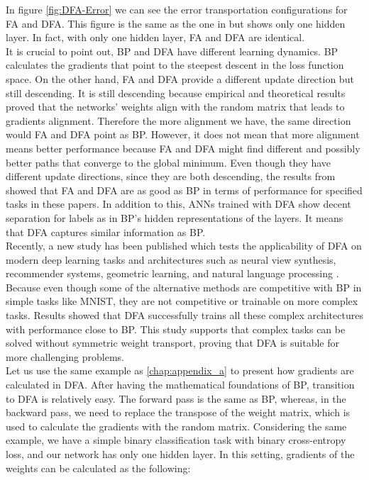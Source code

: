 \documentclass[a4paper, nobind]{templates/ociamthesis}
\begin{document}
\noindent In figure \ref{fig:DFA-Error} we can see the error transportation configurations for FA and DFA. This figure is the same as the one in \cite{nøkland2016direct} but shows only one hidden layer. In fact, with only one hidden layer, FA and DFA are identical.\\
It is crucial to point out, BP and DFA have different learning dynamics. BP calculates the gradients that point to the steepest descent in the loss function space. On the other hand, FA and DFA provide a different update direction but still descending. It is still descending because empirical and theoretical results proved that the networks' weights align with the random matrix that leads to gradients alignment. Therefore the more alignment we have, the same direction would FA and DFA point as BP. However, it does not mean that more alignment means better performance because FA and DFA might find different and possibly better paths that converge to the global minimum. Even though they have different update directions, since they are both descending, the results from \cite{lillicrap2014random, nøkland2016direct} showed that FA and DFA are as good as BP in terms of performance for specified tasks in these papers. In addition to this, ANNs trained with DFA show decent separation for labels as in BP's hidden representations of the layers. It means that DFA captures similar information as BP.\\
Recently, a new study has been published which tests the applicability of DFA on modern deep learning tasks and architectures such as neural view synthesis, recommender systems, geometric learning, and natural language processing \cite{launay2020direct}. Because even though some of the alternative methods are competitive with BP in simple tasks like MNIST, they are not competitive or trainable on more complex tasks. Results showed that DFA successfully trains all these complex architectures with performance close to BP. This study supports that complex tasks can be solved without symmetric weight transport, proving that DFA is suitable for more challenging problems.\\
Let us use the same example as \ref{chap:appendix_a} to present how gradients are calculated in DFA. After having the mathematical foundations of BP, transition to DFA is relatively easy. The forward pass is the same as BP, whereas, in the backward pass, we need to replace the transpose of the weight matrix, which is used to calculate the gradients with the random matrix. Considering the same example, we have a simple binary classification task with binary cross-entropy loss, and our network has only one hidden layer. In this setting, gradients of the weights can be calculated as the following:
\end{document}
